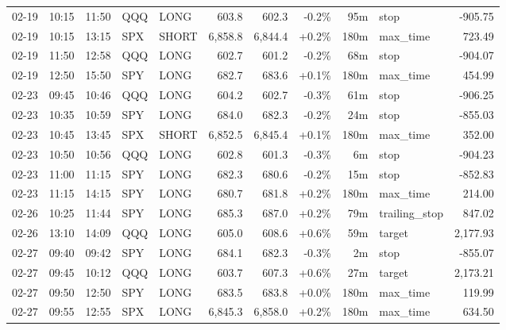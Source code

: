 \documentclass[11pt,a4paper,twoside]{article}
\begin{document}
\begin{center}
\begin{longtable}{>{\color{txtmain}}l l l l l r r r r >{\color{txtmain}}l r}
02-19 & 10:15 & 11:50 & QQQ & LONG & 603.8 & 602.3 & \textcolor{lossred}{-0.2\%} & 95m & stop & \textcolor{lossred}{-905.75} \\
02-19 & 10:15 & 13:15 & SPX & SHORT & 6,858.8 & 6,844.4 & \textcolor{wingreen}{+0.2\%} & 180m & max\_time & \textcolor{wingreen}{723.49} \\
02-19 & 11:50 & 12:58 & QQQ & LONG & 602.7 & 601.2 & \textcolor{lossred}{-0.2\%} & 68m & stop & \textcolor{lossred}{-904.07} \\
02-19 & 12:50 & 15:50 & SPY & LONG & 682.7 & 683.6 & \textcolor{wingreen}{+0.1\%} & 180m & max\_time & \textcolor{wingreen}{454.99} \\
02-23 & 09:45 & 10:46 & QQQ & LONG & 604.2 & 602.7 & \textcolor{lossred}{-0.3\%} & 61m & stop & \textcolor{lossred}{-906.25} \\
02-23 & 10:35 & 10:59 & SPY & LONG & 684.0 & 682.3 & \textcolor{lossred}{-0.2\%} & 24m & stop & \textcolor{lossred}{-855.03} \\
02-23 & 10:45 & 13:45 & SPX & SHORT & 6,852.5 & 6,845.4 & \textcolor{wingreen}{+0.1\%} & 180m & max\_time & \textcolor{wingreen}{352.00} \\
02-23 & 10:50 & 10:56 & QQQ & LONG & 602.8 & 601.3 & \textcolor{lossred}{-0.3\%} & 6m & stop & \textcolor{lossred}{-904.23} \\
02-23 & 11:00 & 11:15 & SPY & LONG & 682.3 & 680.6 & \textcolor{lossred}{-0.2\%} & 15m & stop & \textcolor{lossred}{-852.83} \\
02-23 & 11:15 & 14:15 & SPY & LONG & 680.7 & 681.8 & \textcolor{wingreen}{+0.2\%} & 180m & max\_time & \textcolor{wingreen}{214.00} \\
02-26 & 10:25 & 11:44 & SPY & LONG & 685.3 & 687.0 & \textcolor{wingreen}{+0.2\%} & 79m & trailing\_stop & \textcolor{wingreen}{847.02} \\
02-26 & 13:10 & 14:09 & QQQ & LONG & 605.0 & 608.6 & \textcolor{wingreen}{+0.6\%} & 59m & target & \textcolor{wingreen}{2,177.93} \\
02-27 & 09:40 & 09:42 & SPY & LONG & 684.1 & 682.3 & \textcolor{lossred}{-0.3\%} & 2m & stop & \textcolor{lossred}{-855.07} \\
02-27 & 09:45 & 10:12 & QQQ & LONG & 603.7 & 607.3 & \textcolor{wingreen}{+0.6\%} & 27m & target & \textcolor{wingreen}{2,173.21} \\
02-27 & 09:50 & 12:50 & SPY & LONG & 683.5 & 683.8 & \textcolor{wingreen}{+0.0\%} & 180m & max\_time & \textcolor{wingreen}{119.99} \\
02-27 & 09:55 & 12:55 & SPX & LONG & 6,845.3 & 6,858.0 & \textcolor{wingreen}{+0.2\%} & 180m & max\_time & \textcolor{wingreen}{634.50} \\
\end{longtable}
\end{center}
\clearpage
\end{document}

